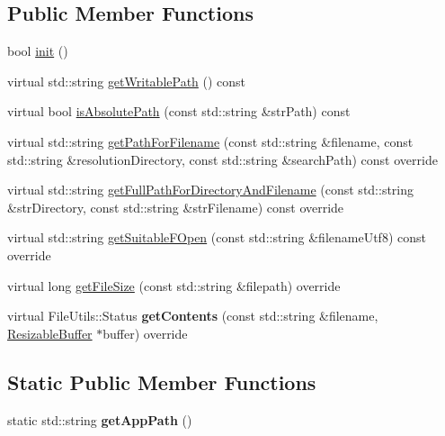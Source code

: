 \subsection*{Public Member Functions}
\begin{DoxyCompactItemize}
\item 
bool \hyperlink{classCCFileUtilsWinRT_a1f2d5c30d599ab4490a2dead634f7459}{init} ()
\item 
virtual std\+::string \hyperlink{classCCFileUtilsWinRT_a546c4b1920e4484929a0d3cffe554720}{get\+Writable\+Path} () const
\item 
virtual bool \hyperlink{classCCFileUtilsWinRT_a25ecf188d3b1724cfa64e040d2a93f7b}{is\+Absolute\+Path} (const std\+::string \&str\+Path) const
\item 
virtual std\+::string \hyperlink{classCCFileUtilsWinRT_a547ce34a14879e9b236ad726932c7d00}{get\+Path\+For\+Filename} (const std\+::string \&filename, const std\+::string \&resolution\+Directory, const std\+::string \&search\+Path) const override
\item 
virtual std\+::string \hyperlink{classCCFileUtilsWinRT_ab72a708f0159e1d0929053540421a2df}{get\+Full\+Path\+For\+Directory\+And\+Filename} (const std\+::string \&str\+Directory, const std\+::string \&str\+Filename) const override
\item 
virtual std\+::string \hyperlink{classCCFileUtilsWinRT_a655652f655870c93e5fd01259b3eca6b}{get\+Suitable\+F\+Open} (const std\+::string \&filename\+Utf8) const override
\item 
virtual long \hyperlink{classCCFileUtilsWinRT_a56b2cacd3791ebf132e90b5abce17db3}{get\+File\+Size} (const std\+::string \&filepath) override
\item 
\mbox{\label{classCCFileUtilsWinRT_a27981a5c26ddb5ed500de355d3b6a174}} 
virtual File\+Utils\+::\+Status {\bfseries get\+Contents} (const std\+::string \&filename, \hyperlink{classResizableBuffer}{Resizable\+Buffer} $\ast$buffer) override
\end{DoxyCompactItemize}
\subsection*{Static Public Member Functions}
\begin{DoxyCompactItemize}
\item 
\mbox{\label{classCCFileUtilsWinRT_adaa8526ed3c2f27f997e14d04b2f2b28}} 
static std\+::string {\bfseries get\+App\+Path} ()
\end{DoxyCompactItemize}
